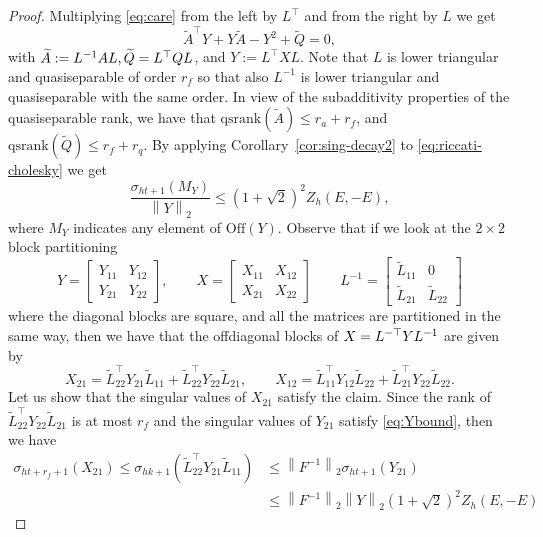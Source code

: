 \documentclass[a4paper,10pt]{article}
\def\qsrank{\mathrm{qsrank}}
\newcommand{\norm}[1]{\left\lVert#1\right\rVert}
\newcommand{\upd}[1]{{\color{black}#1}} %
\begin{document}
\begin{proof}
	Multiplying \eqref{eq:care} from the left by $L^\top$ and from the right by $L$ we get
	\begin{equation}\label{eq:riccati-cholesky}
		\widetilde A^\top Y + Y\widetilde A- Y^2+ \widetilde Q=0,
	\end{equation}
	with $\widetilde A:=L^{-1}AL, \widetilde Q =L\upd{^\top}QL$, and $Y:=L^\top XL$. Note that $L$ is lower triangular and quasiseparable of order $r_f$  so that also $L^{-1}$ is lower triangular and quasiseparable with the same order. In view of the \upd{subadditivity} properties of the quasiseparable rank, we have that $\qsrank(\widetilde A)\le r_a+r_f$, and  $\qsrank(\widetilde Q)\le r_f+r_q$.
	By applying Corollary~\ref{cor:sing-decay2} to \eqref{eq:riccati-cholesky} we get 
	\begin{equation}\label{eq:Ybound}
		\frac{\sigma_{ht+1}(M_Y)}{\norm{Y}_2}\le (1+\sqrt{2})^2 Z_h(E,-E),
	\end{equation}
	where $M_Y$ indicates 
	any element of $\mathrm{Off}(Y)$. Observe that if we look at the $2\times 2$ block partitioning
	$$
	Y=\begin{bmatrix}
		Y_{11} & Y_{12}\\
		Y_{21}&Y_{22}
	\end{bmatrix}, \qquad X=\begin{bmatrix}
		X_{11} & X_{12}\\
		X_{21}&X_{22}
	\end{bmatrix}\qquad L^{-1}=\begin{bmatrix}
		\widetilde L_{11} & 0\\
		\widetilde L_{21}&\widetilde L_{22}
	\end{bmatrix}
	$$
	where the diagonal blocks are square, and all the matrices are partitioned in the same way, then we have that the offdiagonal blocks of $X=L^{-\upd{\top}}YL^{-1}$ are given by 
	$$
	X_{21}= \widetilde L_{22}^\top Y_{21}\widetilde L_{11} +\widetilde L_{22}^\top Y_{22}\widetilde L_{21}, \qquad  X_{12}= \widetilde L_{11}^\top Y_{12}\widetilde L_{22} +\widetilde L_{21}^\top Y_{22}\widetilde L_{22}.
	$$
	Let us show that the singular values of $X_{21}$ satisfy the claim. Since the rank of $\widetilde L_{22}^\top Y_{22}\widetilde L_{21}$ is at most $r_f$ and the singular values of $Y_{21}$ satisfy \eqref{eq:Ybound}, then we have
	\begin{align*}
		\sigma_{ht+r_f+1}(X_{21})\le \sigma_{hk+1}(\widetilde L_{22}^\top Y_{21}\widetilde L_{11})&\le \norm{F^{-1}}_2 \sigma_{ht+1}(Y_{21})\\ &\le \norm{F^{-1}}_2\norm{Y}_2 (1+\sqrt{2})^2 Z_h(E,-E)

\end{align*}
\end{proof}
\end{document}
